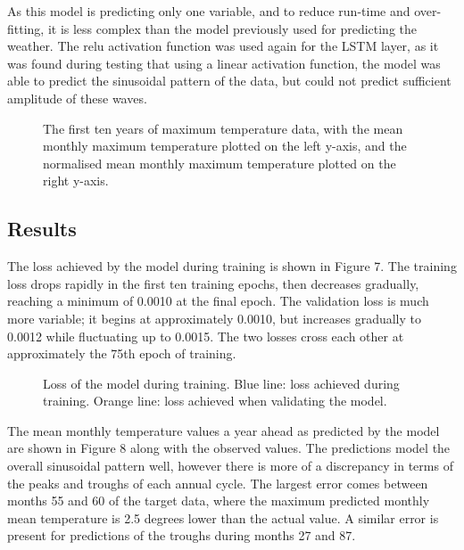 \documentclass[12pt]{article}
\begin{document}
    As this model is predicting only one variable, and to reduce run-time and over-fitting, it is less complex than the model previously used for predicting the weather. The relu activation function was used again for the LSTM layer, as it was found during testing that using a linear activation function, the model was able to predict the sinusoidal pattern of the data, but could not predict sufficient amplitude of these waves.

    \begin{figure}
    \centering
        
        \caption{The first ten years of maximum temperature data, with the mean monthly maximum temperature plotted on the left y-axis, and the normalised mean monthly maximum temperature plotted on the right y-axis.}
        \label{fig:climate_input_temps}
    \end{figure}
    
\subsection{Results}

    The loss achieved by the model during training is shown in Figure 7. The training loss drops rapidly in the first ten training epochs, then decreases gradually, reaching a minimum of 0.0010 at the final epoch. The validation loss is much more variable; it begins at approximately 0.0010, but increases gradually to 0.0012 while fluctuating up to 0.0015. The two losses cross each other at approximately the 75th epoch of training.
    
    \begin{figure}
        \centering
        
        \caption{Loss of the model during training. Blue line: loss achieved during training. Orange line: loss achieved when validating the model.}
        \label{fig:climate_loss}
    \end{figure}

    The mean monthly temperature values a year ahead as predicted by the model are shown in Figure 8 along with the observed values. The predictions model the overall sinusoidal pattern well, however there is more of a discrepancy in terms of the peaks and troughs of each annual cycle. The largest error comes between months 55 and 60 of the target data, where the maximum predicted monthly mean temperature is 2.5 degrees lower than the actual value. A similar error is present for predictions of the troughs during months 27 and 87.
    
\end{document}
